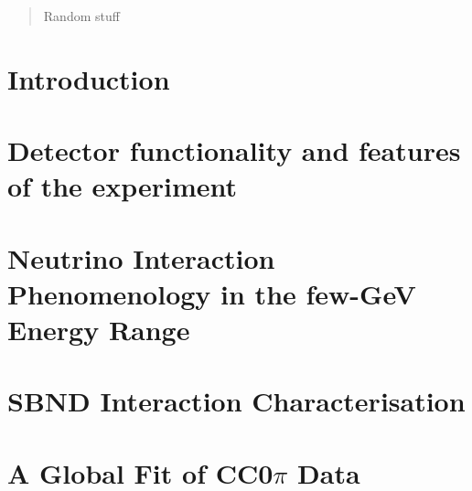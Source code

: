 \documentclass[11pt]{article}
\begin{document}
\vspace{6mm}
\begin{abstract}
    Random stuff
\end{abstract}
\newpage
\section{Introduction}
\label{sec:intro}



\section{Detector functionality and features of the experiment}
\label{sec:LArTPC}



\section{Neutrino Interaction Phenomenology in the few-GeV Energy Range}
\label{sec:NIP}



\section{SBND Interaction Characterisation}
\label{sec:CharEx}



\section{A Global Fit of CC0\( \pi \) Data}
\label{sec:GF}
\end{document}
